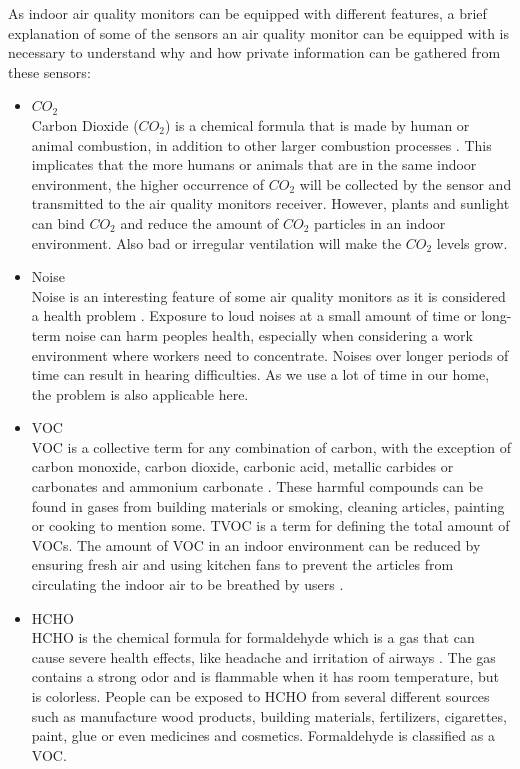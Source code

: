As indoor air quality monitors can be equipped with different features, a brief explanation of some of the sensors an air quality monitor can be equipped with is necessary to understand why and how private information can be gathered from these sensors:
\begin{itemize}
    \item \(CO_2\)\\
        Carbon Dioxide (\(CO_2\)) is a chemical formula that is made by human or animal combustion, in addition to other larger combustion processes \cite{CO2}. This implicates that the more humans or animals that are in the same indoor environment, the higher occurrence of \(CO_2\) will be collected by the sensor and transmitted to the air quality monitors receiver. However, plants and sunlight can bind \(CO_2\) and reduce the amount of \(CO_2\) particles in an indoor environment. Also bad or irregular ventilation will make the \(CO_2\) levels grow. \\
    \item Noise\\
        Noise is an interesting feature of some air quality monitors as it is considered a health problem \cite{Noise}. Exposure to loud noises at a small amount of time or long-term noise can harm peoples health, especially when considering a work environment where workers need to concentrate. Noises over longer periods of time can result in hearing difficulties. As we use a lot of time in our home, the problem is also applicable here. \\
    \item \gls{VOC}\\
        \gls{VOC} is a collective term for any combination of carbon, with the exception of carbon monoxide, carbon dioxide, carbonic acid, metallic carbides or carbonates and ammonium carbonate \cite{VOC}. These harmful compounds can be found in gases from building materials or smoking, cleaning articles, painting or cooking to mention some. \gls{TVOC} is a term for defining the total amount of \gls{VOC}s. The amount of \gls{VOC} in an indoor environment can be reduced by ensuring fresh air and using kitchen fans to prevent the articles from circulating the indoor air to be breathed by users \cite{RecommendedIAQ}.\\
     \item HCHO\\
        HCHO is the chemical formula for formaldehyde which is a gas that can cause severe health effects, like headache and irritation of airways \cite{HCHO}. The gas contains a strong odor and is flammable when it has room temperature, but is colorless. People can be exposed to HCHO from several different sources such as manufacture wood products, building materials, fertilizers, cigarettes, paint, glue or even medicines and cosmetics. Formaldehyde is classified as a \gls{VOC}.\\

\end{itemize}
